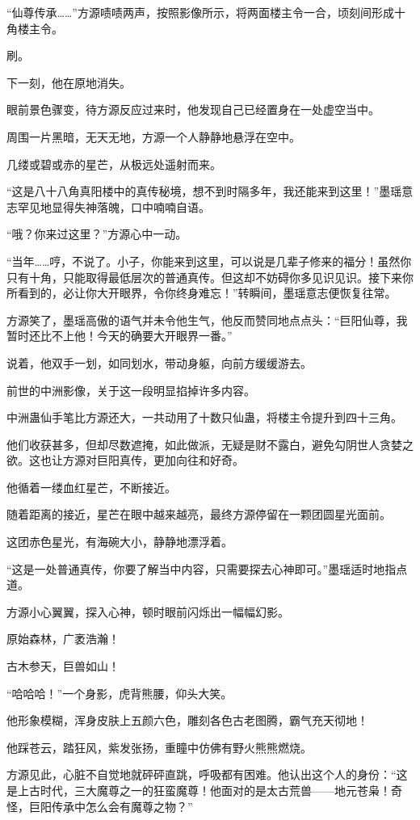 \begin{this_body}
“仙尊传承……”方源啧啧两声，按照影像所示，将两面楼主令一合，顷刻间形成十角楼主令。

刷。

下一刻，他在原地消失。

眼前景色骤变，待方源反应过来时，他发现自己已经置身在一处虚空当中。

周围一片黑暗，无天无地，方源一个人静静地悬浮在空中。

几缕或碧或赤的星芒，从极远处遥射而来。

“这是八十八角真阳楼中的真传秘境，想不到时隔多年，我还能来到这里！”墨瑶意志罕见地显得失神落魄，口中喃喃自语。

“哦？你来过这里？”方源心中一动。

“当年……哼，不说了。小子，你能来到这里，可以说是几辈子修来的福分！虽然你只有十角，只能取得最低层次的普通真传。但这却不妨碍你多见识见识。接下来你所看到的，必让你大开眼界，令你终身难忘！”转瞬间，墨瑶意志便恢复往常。

方源笑了，墨瑶高傲的语气并未令他生气，他反而赞同地点点头：“巨阳仙尊，我暂时还比不上他！今天的确要大开眼界一番。”

说着，他双手一划，如同划水，带动身躯，向前方缓缓游去。

前世的中洲影像，关于这一段明显掐掉许多内容。

中洲蛊仙手笔比方源还大，一共动用了十数只仙蛊，将楼主令提升到四十三角。

他们收获甚多，但却尽数遮掩，如此做派，无疑是财不露白，避免勾阴世人贪婪之欲。这也让方源对巨阳真传，更加向往和好奇。

他循着一缕血红星芒，不断接近。

随着距离的接近，星芒在眼中越来越亮，最终方源停留在一颗团圆星光面前。

这团赤色星光，有海碗大小，静静地漂浮着。

“这是一处普通真传，你要了解当中内容，只需要探去心神即可。”墨瑶适时地指点道。

方源小心翼翼，探入心神，顿时眼前闪烁出一幅幅幻影。

原始森林，广袤浩瀚！

古木参天，巨兽如山！

“哈哈哈！”一个身影，虎背熊腰，仰头大笑。

他形象模糊，浑身皮肤上五颜六色，雕刻各色古老图腾，霸气充天彻地！

他踩苍云，踏狂风，紫发张扬，重瞳中仿佛有野火熊熊燃烧。

方源见此，心脏不自觉地就砰砰直跳，呼吸都有困难。他认出这个人的身份：“这是上古时代，三大魔尊之一的狂蛮魔尊！他面对的是太古荒兽——地元苍枭！奇怪，巨阳传承中怎么会有魔尊之物？”


\end{this_body}
